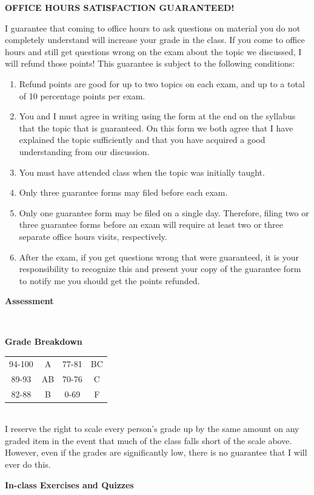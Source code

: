 \documentclass[10pt]{article}
\newcommand{\be}{\begin{enumerate}}
\newcommand{\ee}{\end{enumerate}}
\newcommand{\toprule}{\par\vspace*{5pt}\noindent{\hrule\hfill}\par\vspace*{1pt}}
\newcommand{\botrule}{\par\noindent{\hrule\hfill}\par}
\begin{document}
\botrule \textbf{OFFICE HOURS SATISFACTION GUARANTEED!} \toprule
I guarantee that coming to office hours to ask questions on material you do not completely understand will increase your grade in the class.  If you come to office hours and still get questions wrong on the exam about the topic we discussed, I will refund those points!  This guarantee is subject to the following conditions:
\be
\item Refund points are good for up to two topics on each exam, and up to a total of 10 percentage points per exam.
\item You and I must agree in writing using the form at the end on the syllabus that the topic that is guaranteed.  On this form we both agree that I have explained the topic sufficiently and that you have acquired a good understanding from our discussion.  
\item You must have attended class when the topic was initially taught.
\item Only three guarantee forms may filed before each exam.
\item Only one guarantee form may be filed on a single day.  Therefore, filing two or three guarantee forms before an exam will require at least two or three separate office hours visits, respectively.
\item After the exam, if you get questions wrong that were guaranteed, it is your responsibility to recognize this and present your copy of the guarantee form to notify me you should get the points refunded.
\ee

\botrule \textbf{Assessment} \toprule
\ \\

\botrule \textbf{Grade Breakdown} \toprule
\noindent\begin{tabular}{cccc} \\
94-100 & A & 77-81 & BC  \\
89-93 & AB & 70-76 & C \\
82-88 & B & 0-69 & F \\
\end{tabular}\\

I reserve the right to scale every person's grade up by the same amount on any graded item in the event that much of the class falls short of the scale above.  However, even if the grades are significantly low, there is no guarantee that I will ever do this.  \\

\botrule \textbf{In-class Exercises and Quizzes} \toprule
\ \\  
\end{document}
